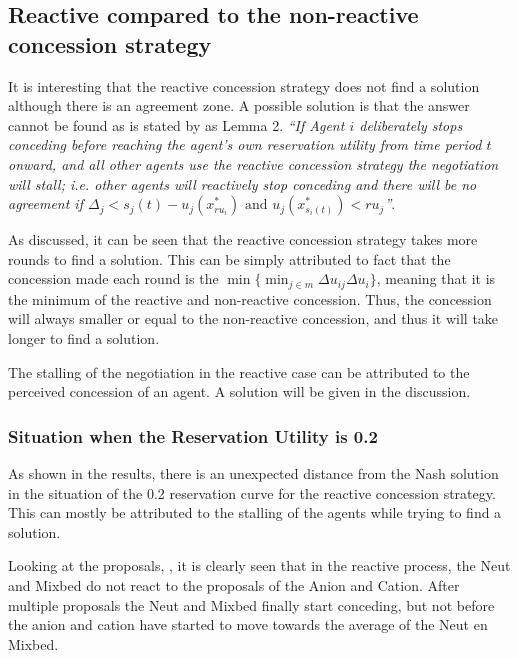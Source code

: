 \subsection{Reactive compared to the non-reactive concession strategy}
It is interesting that the reactive concession strategy does not find a solution although there is an agreement zone. 
A possible solution is that the answer cannot be found as is stated by \citet{zheng2015automated} as Lemma 2. \textit{``If Agent $i$ deliberately stops conceding before reaching the agent's own reservation utility from time period $t$ onward, and all other agents use the reactive concession strategy the negotiation will stall; i.e. other agents will reactively stop conceding and there will be no agreement if $\Delta_j < s_j(t)-u_j(x^*_{ru_i}) \text{ and } u_j(x^*_{s_i(t)})<ru_j$''}.

As discussed, it can be seen that the reactive concession strategy takes more rounds to find a solution. This can be simply attributed to fact that the concession made each round is the $\displaystyle \min\{ \min_{j \in m}\Delta u_{ij} \Delta u_i\}$, meaning that it is the minimum of the reactive and non-reactive concession. Thus, the concession will always smaller or equal to the non-reactive concession, and thus it will take longer to find a solution.

The stalling of the negotiation in the reactive case can be attributed to the perceived concession of an agent. A solution will be given in the discussion.

\subsubsection{Situation when the Reservation Utility is 0.2}
As shown in the results, there is an unexpected distance from the Nash solution in the situation of the 0.2 reservation curve for the reactive concession strategy. This can mostly be attributed to the stalling of the agents while trying to find a solution.

Looking at the proposals, , it is clearly seen that in the reactive process, the Neut and Mixbed do not react to the proposals of the Anion and Cation. After multiple proposals the Neut and Mixbed finally start conceding, but not before the anion and cation have started to move towards the average of the Neut en Mixbed. 

